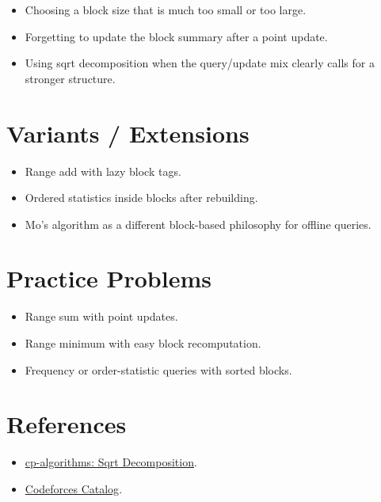 \begin{itemize}
  \item Choosing a block size that is much too small or too large.
  \item Forgetting to update the block summary after a point update.
  \item Using sqrt decomposition when the query/update mix clearly calls for a stronger structure.
\end{itemize}

\section*{Variants / Extensions}

\begin{itemize}
  \item Range add with lazy block tags.
  \item Ordered statistics inside blocks after rebuilding.
  \item Mo's algorithm as a different block-based philosophy for offline queries.
\end{itemize}

\section*{Practice Problems}

\begin{itemize}
  \item Range sum with point updates.
  \item Range minimum with easy block recomputation.
  \item Frequency or order-statistic queries with sorted blocks.
\end{itemize}

\section*{References}

\begin{itemize}
  \item \href{https://cp-algorithms.com/data_structures/sqrt_decomposition.html}{cp-algorithms: Sqrt Decomposition}.
  \item \href{https://codeforces.com/catalog}{Codeforces Catalog}.
\end{itemize}
